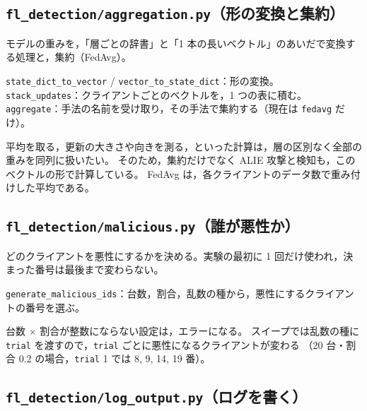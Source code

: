\documentclass[a4j, dvipdfmx]{jsarticle}  %
\begin{document}
\subsection{\texttt{fl\_detection/aggregation.py}（形の変換と集約）}

\begin{description}[leftmargin=1.4em, style=nextline]
  \item[役割] モデルの重みを，「層ごとの辞書」と「1 本の長いベクトル」のあいだで変換する処理と，集約（FedAvg）。
  \item[主な関数]
        \texttt{state\_dict\_to\_vector} / \texttt{vector\_to\_state\_dict}：形の変換。\\
        \texttt{stack\_updates}：クライアントごとのベクトルを，1 つの表に積む。\\
        \texttt{aggregate}：手法の名前を受け取り，その手法で集約する（現在は \texttt{fedavg} だけ）。
  \item[要点] 平均を取る，更新の大きさや向きを測る，といった計算は，層の区別なく全部の重みを同列に扱いたい。
        そのため，集約だけでなく ALIE 攻撃と検知も，このベクトルの形で計算している。
        FedAvg は，各クライアントのデータ数で重み付けした平均である。
\end{description}

\subsection{\texttt{fl\_detection/malicious.py}（誰が悪性か）}

\begin{description}[leftmargin=1.4em, style=nextline]
  \item[役割] どのクライアントを悪性にするかを決める。実験の最初に 1 回だけ使われ，決まった番号は最後まで変わらない。
  \item[主な関数] \texttt{generate\_malicious\_ids}：台数，割合，乱数の種から，悪性にするクライアントの番号を選ぶ。
  \item[要点] 台数 $\times$ 割合が整数にならない設定は，エラーになる。
        スイープでは乱数の種に \texttt{trial} を渡すので，\texttt{trial} ごとに悪性になるクライアントが変わる
        （20 台・割合 0.2 の場合，\texttt{trial} 1 では 8, 9, 14, 19 番）。
\end{description}

\subsection{\texttt{fl\_detection/log\_output.py}（ログを書く）}
\end{document}
